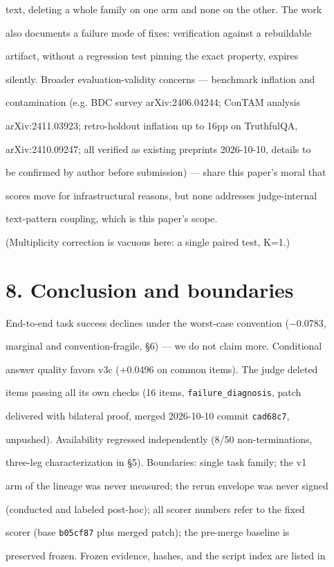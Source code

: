 \documentclass[11pt,a4paper]{article}
\begin{document}
text, deleting a whole family on one arm and none on the other. The work

also documents a failure mode of fixes: verification against a rebuildable

artifact, without a regression test pinning the exact property, expires

silently. Broader evaluation-validity concerns — benchmark inflation and

contamination (e.g. BDC survey arXiv:2406.04244; ConTAM analysis

arXiv:2411.03923; retro-holdout inflation up to 16pp on TruthfulQA,

arXiv:2410.09247; all verified as existing preprints 2026-10-10, details to

be confirmed by author before submission) — share this paper's moral that

scores move for infrastructural reasons, but none addresses judge-internal

text-pattern coupling, which is this paper's scope.

(Multiplicity correction is vacuous here: a single paired test, K=1.)

\section*{8. Conclusion and boundaries}
End-to-end task success declines under the worst-case convention (−0.0783,

marginal and convention-fragile, §6) — we do not claim more. Conditional

answer quality favors v3c (+0.0496 on common items). The judge deleted

items passing all its own checks (16 items, \texttt{failure\_diagnosis}, patch

delivered with bilateral proof, merged 2026-10-10 commit \texttt{cad68c7},

unpushed). Availability regressed independently (8/50 non-terminations,

three-leg characterization in §5). Boundaries: single task family; the v1

arm of the lineage was never measured; the rerun envelope was never signed

(conducted and labeled post-hoc); all scorer numbers refer to the fixed

scorer (base \texttt{b05cf87} plus merged patch); the pre-merge baseline is

preserved frozen. Frozen evidence, hashes, and the script index are listed in
\end{document}
